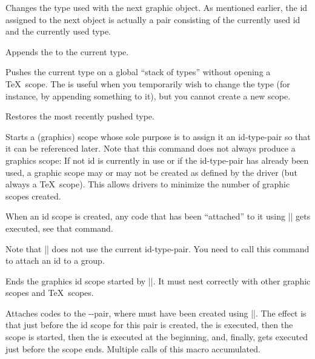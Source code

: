 \begin{command}{\pgfsys@use@type{}}
  Changes the type used with the next graphic object.
  As mentioned earlier, the id assigned to the next object is actually
  a pair consisting of the currently used id and the currently used
  type. 
\end{command}

\begin{command}{\pgfsys@append@type{}}
  Appends the  to the current type. 
\end{command}

\begin{command}{\pgfsys@push@type}
  Pushes the current type on a global ``stack of types'' without
  opening a \TeX\ scope. The is useful when you temporarily wish to
  change the type (for instance, by appending something to it), but
  you cannot create a new scope.
\end{command}

\begin{command}{\pgfsys@pop@type}
  Restores the most recently pushed type.
\end{command}

\begin{command}{\pgfsys@begin@idscope}
  Starts a (graphics) scope whose sole purpose is to assign it an
  id-type-pair so that it can be referenced later. Note that this
  command does not always produce a graphics scope: If not id is
  currently in use or if the id-type-pair has already been used,
  a graphic scope may or may not be created as defined by the driver
  (but always a \TeX\ scope). This allows drivers to minimize the
  number of graphic scopes created.

  When an id scope is created, any code that has been ``attached'' to
  it using |\pgfsys@attach@to@id| gets executed, see that command.

  Note that |\pgfsys@beginscope| does not use the current
  id-type-pair. You need to call this command to attach an id to a
  group. 
\end{command}

\begin{command}{\pgfsys@end@idscope}
  Ends the graphics id scope started by |\pgfsys@end@idscope|. It must
  nest correctly with other graphic scopes and \TeX\ scopes.
\end{command}


\begin{command}{\pgfsys@attach@to@id{}}
  Attaches codes to the --pair, where
   must have been created using |\pgfsys@new@id|. The effect
  is that just before the id scope for this pair is created, the
   is executed, then the scope is started, then the
   is executed at the beginning, and, finally,
   gets executed just before the scope ends. Multiple
  calls of this macro accumulated.
\end{command}


